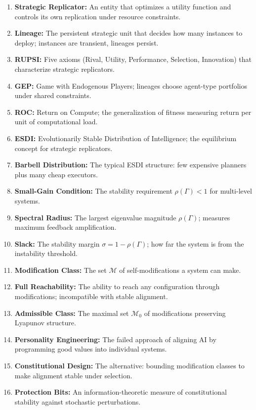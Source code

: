 \documentclass[12pt]{article}
\begin{document}
\begin{enumerate}
\item \textbf{Strategic Replicator:} An entity that optimizes a utility function and controls its own replication under resource constraints.

\item \textbf{Lineage:} The persistent strategic unit that decides how many instances to deploy; instances are transient, lineages persist.

\item \textbf{RUPSI:} Five axioms (Rival, Utility, Performance, Selection, Innovation) that characterize strategic replicators.

\item \textbf{GEP:} Game with Endogenous Players; lineages choose agent-type portfolios under shared constraints.

\item \textbf{ROC:} Return on Compute; the generalization of fitness measuring return per unit of computational load.

\item \textbf{ESDI:} Evolutionarily Stable Distribution of Intelligence; the equilibrium concept for strategic replicators.

\item \textbf{Barbell Distribution:} The typical ESDI structure: few expensive planners plus many cheap executors.

\item \textbf{Small-Gain Condition:} The stability requirement $\rho(\Gamma) < 1$ for multi-level systems.

\item \textbf{Spectral Radius:} The largest eigenvalue magnitude $\rho(\Gamma)$; measures maximum feedback amplification.

\item \textbf{Slack:} The stability margin $\sigma = 1 - \rho(\Gamma)$; how far the system is from the instability threshold.

\item \textbf{Modification Class:} The set $\mathcal{M}$ of self-modifications a system can make.

\item \textbf{Full Reachability:} The ability to reach any configuration through modifications; incompatible with stable alignment.

\item \textbf{Admissible Class:} The maximal set $\mathcal{M}_0$ of modifications preserving Lyapunov structure.

\item \textbf{Personality Engineering:} The failed approach of aligning AI by programming good values into individual systems.

\item \textbf{Constitutional Design:} The alternative: bounding modification classes to make alignment stable under selection.

\item \textbf{Protection Bits:} An information-theoretic measure of constitutional stability against stochastic perturbations.
\end{enumerate}
\end{document}
